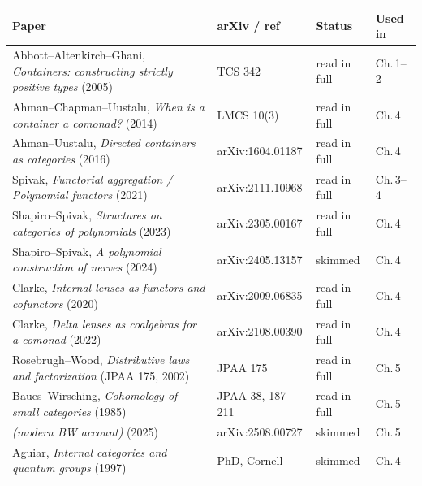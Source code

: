 \documentclass[11pt,a4paper]{book}
\theoremstyle{plain}
\theoremstyle{definition}
\theoremstyle{remark}
\begin{document}
\begin{center}
\renewcommand{\arraystretch}{1.25}
\begin{tabular}{@{}p{5.4cm}p{3.1cm}p{2.4cm}p{2.6cm}@{}}
\toprule
\textbf{Paper} & \textbf{arXiv / ref} & \textbf{Status} & \textbf{Used in} \\
\midrule
Abbott--Altenkirch--Ghani, \emph{Containers: constructing strictly positive types} (2005)
  & TCS 342 & read in full & Ch.\,1--2 \\
Ahman--Chapman--Uustalu, \emph{When is a container a comonad?} (2014)
  & LMCS 10(3) & read in full & Ch.\,4 \\
Ahman--Uustalu, \emph{Directed containers as categories} (2016)
  & arXiv:1604.01187 & read in full & Ch.\,4 \\
Spivak, \emph{Functorial aggregation / Polynomial functors} (2021)
  & arXiv:2111.10968 & read in full & Ch.\,3--4 \\
Shapiro--Spivak, \emph{Structures on categories of polynomials} (2023)
  & arXiv:2305.00167 & read in full & Ch.\,4 \\
Shapiro--Spivak, \emph{A polynomial construction of nerves} (2024)
  & arXiv:2405.13157 & skimmed & Ch.\,4 \\
Clarke, \emph{Internal lenses as functors and cofunctors} (2020)
  & arXiv:2009.06835 & read in full & Ch.\,4 \\
Clarke, \emph{Delta lenses as coalgebras for a comonad} (2022)
  & arXiv:2108.00390 & read in full & Ch.\,4 \\
Rosebrugh--Wood, \emph{Distributive laws and factorization} (JPAA 175, 2002)
  & JPAA 175 & read in full & Ch.\,5 \\
Baues--Wirsching, \emph{Cohomology of small categories} (1985)
  & JPAA 38, 187--211 & read in full & Ch.\,5 \\
\emph{(modern BW account)} (2025)
  & arXiv:2508.00727 & skimmed & Ch.\,5 \\
Aguiar, \emph{Internal categories and quantum groups} (1997)
  & PhD, Cornell & skimmed & Ch.\,4 \\
\bottomrule
\end{tabular}
\end{center}
\end{document}
